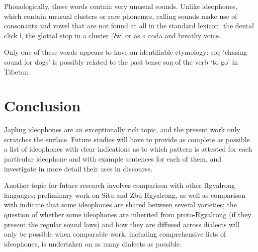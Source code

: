 \documentclass[oldfontcommands,oneside,a4paper,11pt]{article}
\newcommand{\ipa}[1]{{\phon \mbox{#1}}} %
\begin{document}
Phonologically, these words contain very unusual sounds. Unlike ideophones, which contain unusual clusters or rare phonemes, calling sounds make use of consonants and vowel that are not found at all in the standard lexicon: the dental click  \ipa{ǀ}, the glottal stop in a cluster [ʔw] or as a coda and breathy voice.

Only one of these words appears to have an identifiable etymology: \ipa{soŋ} `chasing sound for dogs' is possibly related to the past tense \ipa{soŋ} of the verb `to go' in Tibetan. 

 \section{Conclusion}
 
Japhug ideophones are an exceptionally rich topic, and the present work only scratches the surface. Future studies will have to provide as complete as possible a list of ideophones  with clear indications as to which pattern is attested for each particular ideophone and with example sentences for each of them, and investigate in more detail their uses in discourse.


Another topic for future research involves comparison with other Rgyalrong languages; preliminary work on Situ and Zbu Rgyalrong, as well as comparison with \citet{jackson04zhuangmaoci} indicate that some ideophones are shared between several varieties; the question of whether some ideophones are inherited from proto-Rgyalrong (if they present the regular sound laws) and how they are diffused across dialects will only be possible when comparable work, including comprehensive lists of ideophones, is undertaken on as many dialects as possible.
 



 
\end{document}
